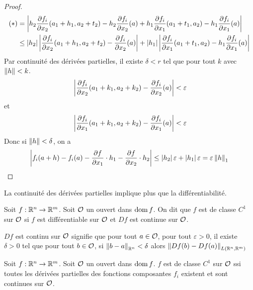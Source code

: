 \begin{proof}
\begin{align*}
        (*) &= \left| h_2\frac{\partial f_i}{\partial x_2}(a_1+h_1,  a_2+t_2)-h_2\frac{\partial f_i}{\partial x_2}(a)+h_1\frac{\partial f_i}{\partial x_1}(a_1+t_1,  a_2)-h_1\frac{\partial f_i}{\partial x_1}(a) \right|\\
        &\leq \left| h_2 \right|\left| \frac{\partial f_i}{\partial x_2}(a_1+h_1,  a_2+t_2)-\frac{\partial f_i}{\partial x_2}(a) \right|+\left| h_1 \right|\left| \frac{\partial f_i}{\partial x_1}(a_1+t_1,  a_2)-h_1\frac{\partial f_i}{\partial x_1}(a) \right|
    \end{align*}
    Par continuité des dérivées partielles, il existe $\delta<r$ tel que pour tout $k$ avec $\left\| h \right\|<k$.
    \begin{equation*}\
        \left| \frac{\partial f_i}{\partial x_2}(a_1+k_1,a_2+k_2)-\frac{\partial f_i}{\partial x_2}(a) \right|<\varepsilon
    \end{equation*}
    et
     \begin{equation*}\
        \left| \frac{\partial f_i}{\partial x_1}(a_1+k_1,a_2+k_2)-\frac{\partial f_i}{\partial x_1}(a) \right|<\varepsilon
    \end{equation*}
    Donc si $\left\| h \right\|<\delta$, on a 
    $$
        \left| f_i(a+h)-f_i(a)-\frac{\partial f}{\partial x_1}\cdot h_1-\frac{\partial f}{\partial x_2}\cdot h_2 \right|\leq \left| h_2 \right|\varepsilon+\left| h_1 \right|\varepsilon=\varepsilon\left\| h \right\| _1
    $$
\end{proof}
La continuité des dérivées partielles implique plus que la différentiabilité.
\begin{definition}
    Soit $f:\mathbb{R}^n\to\mathbb{R}^m$. Soit $\mathcal{O}$ un ouvert dans $\operatorname{dom} f$. On dit que $f$ est de classe $C^1$ sur $\mathcal{O}$ si $f$ est différentiable sur $\mathcal{O}$ et $Df$ est continue sur $\mathcal{O}$.
\end{definition}
\begin{remarque}
    $Df$ est continu sur $\mathcal{O}$ signifie que pour tout $a\in \mathcal{O}$, pour tout $\varepsilon>0$, il existe $\delta >0$ tel que pour tout $b\in\mathcal{O}$, si $\left\| b-a \right\|_{\mathbb{R}^n}<\delta$ alors $\left\| Df(b)-Df(a) \right\|_{L(\mathbb{R}^n,\mathbb{R}^m)}$
\end{remarque}
\begin{theoreme}
    Soit $f: \mathbb{R}^n\to\mathbb{R}^m$. Soit $\mathcal{O}$ un ouvert dans $\operatorname{dom} f$. $f$ est de classe $C^1$ sur $\mathcal{O}$ ssi toutes les dérivées partielles des fonctions composantes $f_i$ existent et sont continues sur $\mathcal{O}$.
\end{theoreme}
